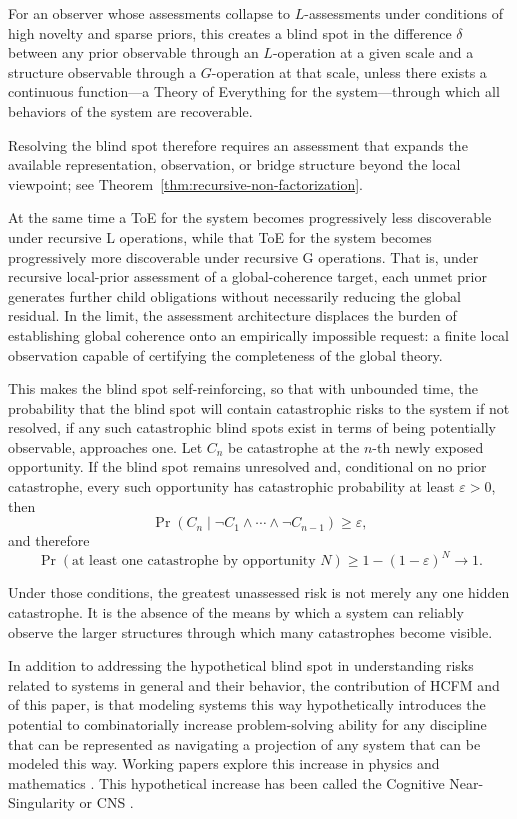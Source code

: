 \documentclass[11pt]{article}
\theoremstyle{definition}
\begin{document}
For an observer whose assessments collapse to $L$-assessments under conditions of high novelty and sparse priors, this creates a blind spot in the difference $\delta$ between any prior observable through an $L$-operation at a given scale and a structure observable through a $G$-operation at that scale, unless there exists a continuous function---a Theory of Everything for the system---through which all behaviors of the system are recoverable.

Resolving the blind spot therefore requires an assessment that expands the available representation, observation, or bridge structure beyond the local viewpoint; see Theorem~\ref{thm:recursive-non-factorization}.

At the same time a ToE for the system becomes progressively less discoverable under recursive L operations, while that ToE for the system becomes progressively more discoverable under recursive G operations. That is, under recursive local-prior assessment of a global-coherence target, each unmet prior generates further child obligations without necessarily reducing the global residual. In the limit, the assessment architecture displaces the burden of establishing global coherence onto an empirically impossible request: a finite local observation capable of certifying the completeness of the global theory. 

This makes the blind spot self-reinforcing, so that with unbounded time, the probability that the blind spot will contain catastrophic risks to the system if not resolved, if any such catastrophic blind spots exist in terms of being potentially observable, approaches one. Let $C_n$ be catastrophe at the $n$-th newly exposed opportunity. If the blind spot remains unresolved and, conditional on no prior catastrophe, every such opportunity has catastrophic probability at least $\varepsilon > 0$, then
\[
\Pr\!\left(
C_n
\mid
\neg C_1 \land \cdots \land \neg C_{n-1}
\right)
\geq
\varepsilon,
\]
and therefore
\[
\Pr\!\left(
\text{at least one catastrophe by opportunity } N
\right)
\geq
1 - (1-\varepsilon)^N
\longrightarrow
1.
\]

Under those conditions, the greatest unassessed risk is not merely any one hidden catastrophe. It is the absence of the means by which a system can reliably observe the larger structures through which many catastrophes become visible.

In addition to addressing the hypothetical blind spot in understanding risks related to systems in general and their behavior, the contribution of HCFM and of this paper, is that modeling systems this way hypothetically introduces the potential to combinatorially increase problem-solving ability for any discipline that can be represented as navigating a projection of any system that can be modeled this way. Working papers explore this increase in physics \cite{williams2026propagating} and mathematics \cite{williams2026physical}. This hypothetical increase has been called the Cognitive Near-Singularity or CNS \cite{12}.
\end{document}
